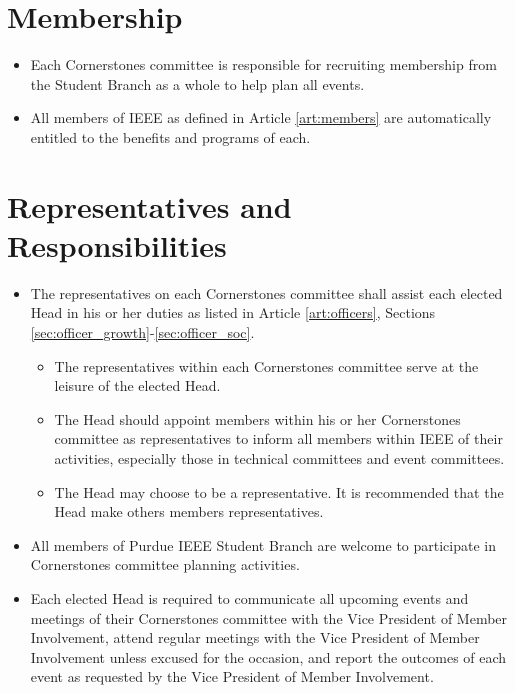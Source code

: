 \documentclass[12pt]{constitution}
\begin{document}
\section{Membership}
\label{sec:corner_auto}
\begin{itemize}
    \item Each Cornerstones committee is responsible for recruiting membership from the Student Branch as a whole to help plan all events.
    \item All members of IEEE as defined in Article \ref{art:members} are automatically entitled to the benefits and programs of each.
\end{itemize}

\section{Representatives and Responsibilities}
\label{sec:corner_represent}
\begin{itemize}
    \item The representatives on each Cornerstones committee shall assist each elected Head in his or her duties as listed in Article \ref{art:officers}, Sections \ref{sec:officer_growth}-\ref{sec:officer_soc}.
    \begin{itemize}
        \item The representatives within each Cornerstones committee serve at the leisure of the elected Head.
        \item The Head should appoint members within his or her Cornerstones committee as representatives to inform all members within IEEE of their activities, especially those in technical committees and event committees.
        \item The Head may choose to be a representative. It is recommended that the Head make others members representatives.
    \end{itemize}
    \item All members of Purdue IEEE Student Branch are welcome to participate in Cornerstones committee planning activities.
    \item Each elected Head is required to communicate all upcoming events and meetings of their Cornerstones committee with the Vice President of Member Involvement, attend regular meetings with the Vice President of Member Involvement unless excused for the occasion, and report the outcomes of each event as requested by the Vice President of Member Involvement.
\end{itemize}
\end{document}
